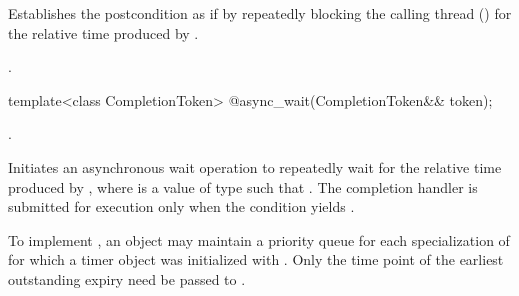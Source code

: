 \begin{itemdescr}
\pnum
\effects Establishes the postcondition as if by repeatedly blocking the calling thread () for the relative time produced by .

\pnum
\postconditions {}.
\end{itemdescr}

\begin{itemdecl}
template<class CompletionToken>
  @\DEDUCED@ async_wait(CompletionToken&& token);
\end{itemdecl}

\begin{itemdescr}
\pnum
\completionsig {}.

\pnum
\effects Initiates an asynchronous wait operation to repeatedly wait for the relative time produced by , where  is a value of type  such that . The completion handler is submitted for execution only when the condition  yields .

\pnum
\enternote To implement , an  object  may maintain a priority queue for each specialization of  for which a timer object was initialized with . Only the time point  of the earliest outstanding expiry need be passed to . \exitnote
\end{itemdescr}




